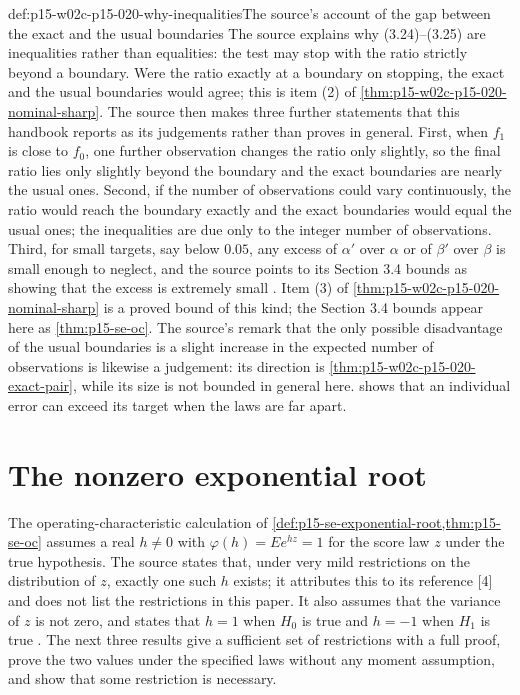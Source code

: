 \begin{hbwarning}{def:p15-w02c-p15-020-why-inequalities}{The source's account of the gap between the exact and the usual boundaries}
The source explains why (3.24)--(3.25) are inequalities rather than
equalities: the test may stop with the ratio strictly beyond a
boundary. Were the ratio exactly at a boundary on stopping, the exact
and the usual boundaries would agree; this is item (2) of
\cref{thm:p15-w02c-p15-020-nominal-sharp}. The source then makes three
further statements that this handbook reports as its judgements rather
than proves in general.
First, when \(f_1\) is close to \(f_0\), one further observation
changes the ratio only slightly, so the final ratio lies only slightly
beyond the boundary and the exact boundaries are nearly the usual ones.
Second, if the number of observations could vary continuously, the
ratio would reach the boundary exactly and the exact boundaries would
equal the usual ones; the inequalities are due only to the integer
number of observations.
Third, for small targets, say below \(0.05\), any excess of
\(\alpha'\) over \(\alpha\) or of \(\beta'\) over \(\beta\) is small
enough to neglect, and the source points to its Section 3.4 bounds as
showing that the excess is extremely small
\cite[Section 3.3, pp.~132--133]{Wald1945SequentialTests}.
Item (3) of \cref{thm:p15-w02c-p15-020-nominal-sharp} is a proved
bound of this kind; the Section 3.4 bounds appear here as
\cref{thm:p15-se-oc}. The source's remark that the only possible
disadvantage of the usual boundaries is a slight increase in the
expected number of observations is likewise a judgement: its direction
is \cref{thm:p15-w02c-p15-020-exact-pair}, while its size is not
bounded in general here.  shows that an
individual error can exceed its target when the laws are far apart.
\end{hbwarning}

\section{The nonzero exponential root}
\label{sec:p15-w02c-p15-020-root}

The operating-characteristic calculation of
\cref{def:p15-se-exponential-root,thm:p15-se-oc} assumes a real
\(h\neq0\) with \(\varphi(h)=Ee^{hz}=1\) for the score law \(z\) under
the true hypothesis. The source states that, under very mild
restrictions on the distribution of \(z\), exactly one such \(h\)
exists; it attributes this to its reference [4] and does not list the
restrictions in this paper. It also assumes that the variance of
\(z\) is not zero, and states that \(h=1\) when \(H_0\) is true and
\(h=-1\) when \(H_1\) is true
\cite[Section 3.4, pp.~134--135]{Wald1945SequentialTests}.
The next three results give a sufficient set of restrictions with a
full proof, prove the two values under the specified laws without any
moment assumption, and show that some restriction is necessary.

